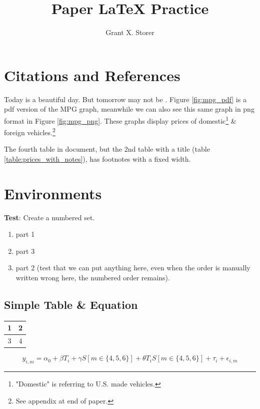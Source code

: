 \documentclass[11pt,letterpaper]{article}
\author{Grant X. Storer}
\title{Paper LaTeX Practice}
\begin{document}
\maketitle
\section{Citations and References}

Today is a beautiful day. But tomorrow may not be \parencite{keefer2022demand}. Figure \ref{fig:mpg_pdf} is a pdf version of the MPG graph, meanwhile we can also see this same graph in png format in Figure \ref{fig:mpg_png}. These graphs display prices of domestic\footnote{"Domestic" is referring to U.S. made vehicles.\label{fnote:domestic}} 
\& foreign vehicles.\footnote{See appendix at end of paper.\label{fnote:back}}

The fourth table in document, but the 2nd table with a title (table \ref{table:prices_with_notes}), has footnotes with a fixed width. 

\section{Environments}

\textbf{Test}: Create a numbered set. 
\begin{enumerate}
\item part 1
\item part 3
\item part 2 (test that we can put anything here, even when the order is manually written wrong here, the numbered order remains).
\end{enumerate}

\subsection{Simple Table \& Equation}

\begin{table}[htbp]\centering
\begin{tabular}{|c|c|}
\hline 
1 & 2 \\ 
\hline 
3 & 4 \\ 
\hline 
\end{tabular} 
\end{table}

\begin{equation}
\label{eq:DID}
y_{i,m} = \alpha_0 + \beta{T}_{i} + \gamma{S}[m \in \{4,5,6\}] + \theta{T}_{i}{S}[m \in \{4,5,6\}] + \tau_{i} + \epsilon_{i,m}
\end{equation}
\end{document}
